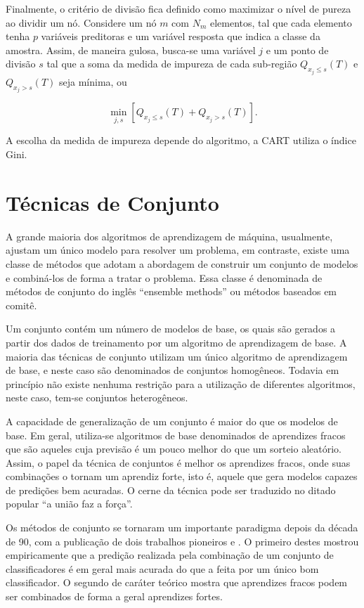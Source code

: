Finalmente, o critério de divisão fica definido como maximizar o nível de pureza ao dividir um nó. Considere um nó $m$ com $N_m$ elementos, tal que cada elemento tenha $p$ variáveis preditoras e um variável resposta que indica a classe da amostra. Assim, de maneira gulosa, busca-se uma variável $j$ e um ponto de divisão $s$ tal que a soma da medida de impureza de cada sub-região $Q_{x_j\le{s}}(T)$ e $Q_{x_j>{s}}(T)$ seja mínima, ou

\begin{equation}
\min_{j,s}\left[Q_{x_j\le{s}}(T)+Q_{x_j>{s}}(T)\right]\mbox{.}
\end{equation}

A escolha da medida de impureza depende do algoritmo, a CART utiliza o índice Gini.

\section{Técnicas de Conjunto}

A grande maioria dos algoritmos de aprendizagem de máquina, usualmente, ajustam um único modelo para resolver um problema, em contraste, existe uma classe de métodos que adotam a abordagem de construir um conjunto de modelos e combiná-los de forma a tratar o problema. Essa classe é denominada de métodos de conjunto do inglês ``ensemble methods'' ou métodos baseados em comitê.

Um conjunto contém um número de modelos de base, os quais são gerados a partir dos dados de treinamento por um algoritmo de aprendizagem de base. A maioria das técnicas de conjunto utilizam um único algoritmo de aprendizagem de base, e neste caso são denominados de conjuntos homogêneos. Todavia em princípio não existe nenhuma restrição para a utilização de diferentes algoritmos, neste caso, tem-se conjuntos heterogêneos.

A capacidade de generalização de um conjunto é maior do que os modelos de base. Em geral, utiliza-se algoritmos de base denominados de aprendizes fracos que são aqueles cuja previsão é um pouco melhor do que um sorteio aleatório. Assim, o papel da técnica de conjuntos é melhor os aprendizes fracos, onde suas combinações o tornam um aprendiz forte, isto é, aquele que gera modelos capazes de predições bem acuradas. O cerne da técnica pode ser traduzido no ditado popular ``a união faz a força''.

Os métodos de conjunto se tornaram um importante paradigma depois da década de 90, com a publicação de dois trabalhos pioneiros \cite{HANSEN:1990} e \cite{SCHAPIRE:1990}. O primeiro destes mostrou empiricamente que a predição realizada pela combinação de um conjunto de classificadores é em geral mais acurada do que a feita por um único bom classificador. O segundo de caráter teórico mostra que aprendizes fracos podem ser combinados de forma a geral aprendizes fortes. 

